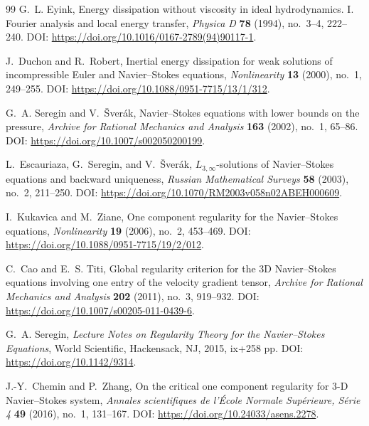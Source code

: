 \documentclass[11pt]{article}
\numberwithin{equation}{section}
\theoremstyle{definition}
\theoremstyle{remark}
\begin{document}
\begin{thebibliography}{99}
G.~L. Eyink,
\newblock Energy dissipation without viscosity in ideal hydrodynamics. I. Fourier analysis and local energy transfer,
\newblock \emph{Physica D} \textbf{78} (1994), no.~3--4, 222--240.
\newblock DOI: \url{https://doi.org/10.1016/0167-2789(94)90117-1}.

J.~Duchon and R.~Robert,
\newblock Inertial energy dissipation for weak solutions of incompressible Euler and Navier--Stokes equations,
\newblock \emph{Nonlinearity} \textbf{13} (2000), no.~1, 249--255.
\newblock DOI: \url{https://doi.org/10.1088/0951-7715/13/1/312}.

G.~A. Seregin and V.~\v{S}ver\'ak,
\newblock Navier--Stokes equations with lower bounds on the pressure,
\newblock \emph{Archive for Rational Mechanics and Analysis} \textbf{163} (2002), no.~1, 65--86.
\newblock DOI: \url{https://doi.org/10.1007/s002050200199}.

L.~Escauriaza, G.~Seregin, and V.~\v{S}ver\'ak,
\newblock $L_{3,\infty}$-solutions of Navier--Stokes equations and backward uniqueness,
\newblock \emph{Russian Mathematical Surveys} \textbf{58} (2003), no.~2, 211--250.
\newblock DOI: \url{https://doi.org/10.1070/RM2003v058n02ABEH000609}.

I.~Kukavica and M.~Ziane,
\newblock One component regularity for the Navier--Stokes equations,
\newblock \emph{Nonlinearity} \textbf{19} (2006), no.~2, 453--469.
\newblock DOI: \url{https://doi.org/10.1088/0951-7715/19/2/012}.

C.~Cao and E.~S. Titi,
\newblock Global regularity criterion for the 3D Navier--Stokes equations involving one entry of the velocity gradient tensor,
\newblock \emph{Archive for Rational Mechanics and Analysis} \textbf{202} (2011), no.~3, 919--932.
\newblock DOI: \url{https://doi.org/10.1007/s00205-011-0439-6}.

G.~A. Seregin,
\newblock \emph{Lecture Notes on Regularity Theory for the Navier--Stokes Equations},
\newblock World Scientific, Hackensack, NJ, 2015, ix+258 pp.
\newblock DOI: \url{https://doi.org/10.1142/9314}.

J.-Y.~Chemin and P.~Zhang,
\newblock On the critical one component regularity for 3-D Navier--Stokes system,
\newblock \emph{Annales scientifiques de l'\'{E}cole Normale Sup\'{e}rieure, S\'{e}rie 4} \textbf{49} (2016), no.~1, 131--167.
\newblock DOI: \url{https://doi.org/10.24033/asens.2278}.


\end{thebibliography}
\end{document}
